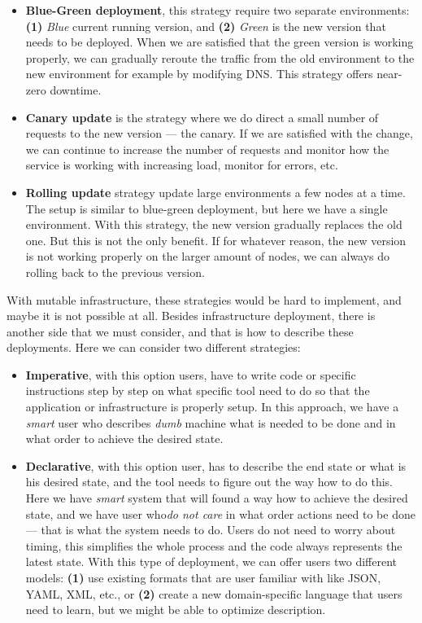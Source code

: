 \begin{itemize}
	\item \textbf{Blue-Green deployment}, this strategy require two separate environments: \textbf{(1)} \textit{Blue} current running version, and \textbf{(2)} \textit{Green} is the new version that needs to be deployed. When we are satisfied that the green version is working properly, we can gradually reroute the traffic from the old environment to the new environment for example by modifying DNS. This strategy offers near-zero downtime.
	\item \textbf{Canary update} is the strategy where we do direct a small number of requests to the new version --- the canary. If we are satisfied with the change, we can continue to increase the number of requests and monitor how the service is working with increasing load, monitor for errors, etc.
	\item \textbf{Rolling update} strategy update large environments a few nodes at a time. The setup is similar to blue-green deployment, but here we have a single environment. With this strategy, the new version gradually replaces the old one. But this is not the only benefit. If for whatever reason, the new version is not working properly on the larger amount of nodes, we can always do rolling back to the previous version.
\end{itemize}

\noindent
With mutable infrastructure, these strategies would be hard to implement, and maybe it is not possible at all. Besides infrastructure deployment, there is another side that we must consider, and that is how to describe these deployments. Here we can consider two different strategies:

\begin{itemize}
	\item \textbf{Imperative}, with this option users, have to write code or specific instructions step by step on what specific tool need to do so that the application or infrastructure is properly setup. In this approach, we have a \textit{smart} user who describes \textit{dumb} machine what is needed to be done and in what order to achieve the desired state.
	\item \textbf{Declarative}, with this option user, has to describe the end state or what is his desired state, and the tool needs to figure out the way how to do this. Here we have \textit{smart} system that will found a way how to achieve the desired state, and we have user who\textit{do not care} in what order actions need to be done --- that is what the system needs to do. Users do not need to worry about timing, this simplifies the whole process and the code always represents the latest state. With this type of deployment, we can offer users two different models: \textbf{(1)} use existing formats that are user familiar with like JSON, YAML, XML, etc., or \textbf{(2)} create a new domain-specific language that users need to learn, but we might be able to optimize description.
\end{itemize}

